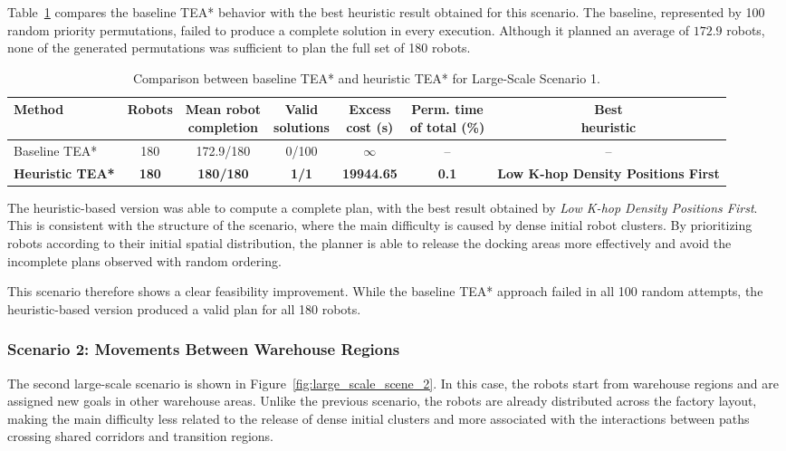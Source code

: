 Table~\ref{tab:large_scale_scene1_summary} compares the baseline TEA* behavior with the best
heuristic result obtained for this scenario. The baseline, represented by 100 random priority
permutations, failed to produce a complete solution in every execution. Although it planned an
average of \(172.9\) robots, none of the generated permutations was sufficient to plan the full set of
180 robots.

\begin{table}[H]
\centering
\caption{Comparison between baseline TEA* and heuristic TEA* for Large-Scale Scenario 1.}
\label{tab:large_scale_scene1_summary}
\footnotesize
\setlength{\tabcolsep}{5pt}
\begin{tabular}{@{}lcccccc@{}}
\toprule
\textbf{Method} &
\textbf{Robots} &
\makecell{\textbf{Mean robot}\\\textbf{completion}} &
\makecell{\textbf{Valid}\\\textbf{solutions}} &
\makecell{\textbf{Excess}\\\textbf{cost (s)}} &
\makecell{\textbf{Perm. time}\\\textbf{of total (\%)}} &
\makecell{\textbf{Best}\\\textbf{heuristic}} \\
\midrule
Baseline TEA* & 180 & 172.9/180 & 0/100 & $\infty$ & -- & -- \\
\textbf{Heuristic TEA*} & \textbf{180} & \textbf{180/180} & \textbf{1/1} & \textbf{19944.65} & \textbf{0.1} & \textbf{Low K-hop Density Positions First} \\
\bottomrule
\end{tabular}
\end{table}

The heuristic-based version was able to compute a complete plan, with the best result obtained by
\textit{Low K-hop Density Positions First}. This is consistent with the structure of the scenario, where the
main difficulty is caused by dense initial robot clusters. By prioritizing robots according to their
initial spatial distribution, the planner is able to release the docking areas more effectively and
avoid the incomplete plans observed with random ordering.

This scenario therefore shows a clear feasibility improvement. While the baseline TEA* approach
failed in all 100 random attempts, the heuristic-based version produced a valid plan for all 180
robots.

\subsubsection{Scenario 2: Movements Between Warehouse Regions}
\label{subsubsec:large_scale_movements_between_warehouses}
\hspace{\parindent}
The second large-scale scenario is shown in Figure~\ref{fig:large_scale_scene_2}. In this case,
the robots start from warehouse regions and are assigned new goals in other warehouse areas.
Unlike the previous scenario, the robots are already distributed across the factory layout, making
the main difficulty less related to the release of dense initial clusters and more associated with
the interactions between paths crossing shared corridors and transition regions.

